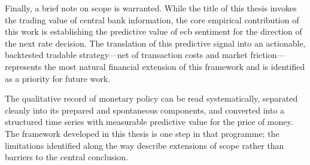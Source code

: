 Finally, a brief note on scope is warranted. While the title of this thesis invokes the trading value of central bank information, the core empirical contribution of this work is establishing the predictive value of \gls{ecb} sentiment for the direction of the next rate decision. The translation of this predictive signal into an actionable, backtested tradable strategy---net of transaction costs and market friction---represents the most natural financial extension of this framework and is identified as a priority for future work.

The qualitative record of monetary policy can be read systematically, separated cleanly into its prepared and spontaneous components, and converted into a structured time series with measurable predictive value for the price of money. The framework developed in this thesis is one step in that programme; the limitations identified along the way describe extensions of scope rather than barriers to the central conclusion.
